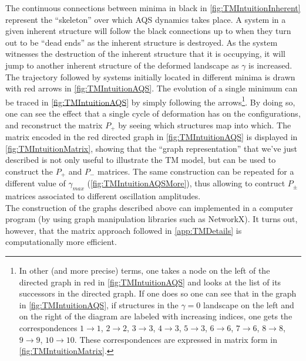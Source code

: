 The continuous connections between minima in black in \autoref{fig:TMIntuitionInherent} represent the ``skeleton'' over which AQS dynamics takes place. A system in a given inherent structure will follow the black connections up to when they turn out to be ``dead ends'' as the inherent structure is destroyed. As the system witnesses the destruction of the inherent structure that it is occupying, it will jump to another inherent structure of the deformed landscape as $\gamma$ is increased. The trajectory followed by systems initially located in different minima is drawn with red arrows in \autoref{fig:TMIntuitionAQS}. The evolution of a single minimum can be traced in \autoref{fig:TMIntuitionAQS} by simply following the arrows\footnote{In other (and more precise) terms, one takes a node on the left of the directed graph in red in \autoref{fig:TMIntuitionAQS} and looks at the list of its successors in the directed graph. If one does so one can see that in the graph in \autoref{fig:TMIntuitionAQS}, if structures in the $\gamma = 0$ landscape on the left and on the right of the diagram are labeled with increasing indices, one gets the correspondences $1 \rightarrow 1$, $2 \rightarrow 2$, $3 \rightarrow 3$, $4 \rightarrow 3$, $5 \rightarrow 3$, $6 \rightarrow 6$, $7 \rightarrow 6$, $8 \rightarrow 8$, $9 \rightarrow 9$, $10 \rightarrow 10$. These correspondences are expressed in matrix form in \autoref{fig:TMIntuitionMatrix}.}. By doing so, one can see the effect that a single cycle of deformation has on the configurations, and reconstruct the matrix $P_{+}$ by seeing which structures map into which. The matrix encoded in the red directed graph in \autoref{fig:TMIntuitionAQS} is displayed in \autoref{fig:TMIntuitionMatrix}, showing that the ``graph representation'' that we've just described is not only useful to illustrate the TM model, but can be used to construct the $P_{+}$ and $P_{-}$ matrices. 
The same construction can be repeated for a different value of $\gamma_{max}$ (\autoref{fig:TMIntuitionAQSMore}), thus allowing to contruct $P_{\pm}$ matrices associated to different oscillation amplitudes. \\
The construction of the graphs described above can implemented in a computer program (by using graph manipulation libraries such as NetworkX). It turns out, however, that the matrix approach followed in \autoref{app:TMDetails} is computationally more efficient. 

